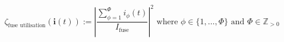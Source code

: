 \begin{equation}
	\zeta_\text{fuse utilisation}(\textbf{i}(t)) :=%
	\left|\frac{\sum_{\phi=1}^{\Phi}{i_\phi(t)}}{I_\text{fuse}}\right|^2%
	\text{ where } \phi \in \{1, \dots, \Phi\}%
	\text{ and } \Phi \in \mathbb{Z}_{>0}
	\label{ch1:equ:fuse-utilisation}
\end{equation}